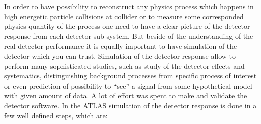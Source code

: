 In order to have possibility to reconstruct any physics process which happens in high energetic particle collisions at collider or to measure some corresponded physics quantity of the process
one need to have a clear picture of the detector response from each detector sub-system. But beside of the understanding of the real detector performance it is equally important to have 
simulation of the detector which you can trust. Simulation of the detector response allow to perform many sophisticated studies, such as study of the detector effects and systematics,
distinguishing background processes from specific process of interest or even prediction of possibility to ``see'' a signal from some hypothetical model with given amount of data.
A lot of effort was spent to make and validate the detector software. In the ATLAS simulation of the detector response is done in a few well defined steps, which are:
